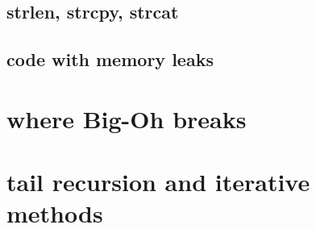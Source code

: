 


\subsection{strlen, strcpy, strcat}



\subsection{code with memory leaks}





\section{where Big-Oh breaks}



\section{tail recursion and iterative methods}



\begin{frame}{}
\end{frame}
